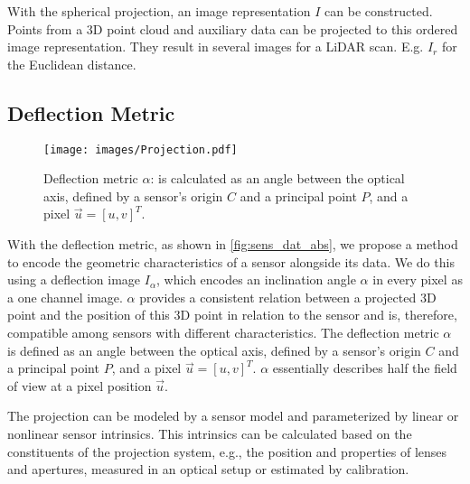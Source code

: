 With the spherical projection, an image representation $I$ can be constructed. Points from a 3D point cloud and auxiliary data can be projected to this ordered image representation. They result in several images for a LiDAR scan.  E.g. $I_{r}$ for the Euclidean distance.

\subsection{Deflection Metric}
\label{sec:deflection}
\begin{figure}[!h] 
    \centering
    \texttt{[image: images/Projection.pdf]}
    \caption{Deflection metric $\alpha$: is calculated as an angle between the optical axis, defined by a sensor's origin $C$ and a principal point $P$, and a pixel $\vec{u}=[u,v]^T$.}
    \label{fig:sens_dat_abs}
\end{figure}
With the deflection metric, as shown in \autoref{fig:sens_dat_abs}, we propose a method to encode the geometric characteristics of a sensor alongside its data. We do this using a deflection image $I_{\alpha}$, which encodes an inclination angle $\alpha$ in every pixel as a one channel image. $\alpha$ provides a consistent relation between a projected 3D point and the position of this 3D point in relation to the sensor and is, therefore, compatible among sensors with different characteristics. The deflection metric $\alpha$ is defined as an angle between the optical axis, defined by a sensor's origin $C$ and a principal point $P$, and a pixel $\vec{u}=[u,v]^T$. $\alpha$ essentially describes half the field of view at a pixel position $\vec{u}$. 

The projection can be modeled by a sensor model and parameterized by linear or nonlinear sensor intrinsics. This intrinsics can be calculated based on the constituents of the projection system, e.g., the position and properties of lenses and apertures, measured in an optical setup or estimated by calibration. 

